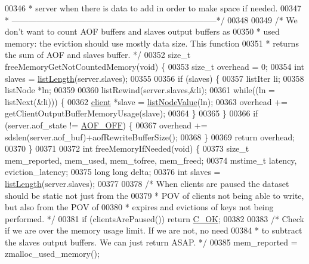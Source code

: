 \begin{DoxyCode}
00346 \textcolor{comment}{ * server when there is data to add in order to make space if needed.}
00347 \textcolor{comment}{ * --------------------------------------------------------------------------*/}
00348 
00349 \textcolor{comment}{/* We don't want to count AOF buffers and slaves output buffers as}
00350 \textcolor{comment}{ * used memory: the eviction should use mostly data size. This function}
00351 \textcolor{comment}{ * returns the sum of AOF and slaves buffer. */}
00352 size\_t freeMemoryGetNotCountedMemory(\textcolor{keywordtype}{void}) \{
00353     size\_t overhead = 0;
00354     \textcolor{keywordtype}{int} slaves = \hyperlink{adlist_8h_afde0ab079f934670e82119b43120e94b}{listLength}(server.slaves);
00355 
00356     \textcolor{keywordflow}{if} (slaves) \{
00357         listIter li;
00358         listNode *ln;
00359 
00360         listRewind(server.slaves,&li);
00361         \textcolor{keywordflow}{while}((ln = listNext(&li))) \{
00362             \hyperlink{structclient}{client} *slave = \hyperlink{adlist_8h_af84cae230e7180ebcda1e2736fce9f65}{listNodeValue}(ln);
00363             overhead += getClientOutputBufferMemoryUsage(slave);
00364         \}
00365     \}
00366     \textcolor{keywordflow}{if} (server.aof\_state != \hyperlink{server_8h_a5226306fbcebcb6d5d02e0fef3c213c2}{AOF\_OFF}) \{
00367         overhead += sdslen(server.aof\_buf)+aofRewriteBufferSize();
00368     \}
00369     \textcolor{keywordflow}{return} overhead;
00370 \}
00371 
00372 \textcolor{keywordtype}{int} freeMemoryIfNeeded(\textcolor{keywordtype}{void}) \{
00373     size\_t mem\_reported, mem\_used, mem\_tofree, mem\_freed;
00374     mstime\_t latency, eviction\_latency;
00375     \textcolor{keywordtype}{long} \textcolor{keywordtype}{long} delta;
00376     \textcolor{keywordtype}{int} slaves = \hyperlink{adlist_8h_afde0ab079f934670e82119b43120e94b}{listLength}(server.slaves);
00377 
00378     \textcolor{comment}{/* When clients are paused the dataset should be static not just from the}
00379 \textcolor{comment}{     * POV of clients not being able to write, but also from the POV of}
00380 \textcolor{comment}{     * expires and evictions of keys not being performed. */}
00381     \textcolor{keywordflow}{if} (clientsArePaused()) \textcolor{keywordflow}{return} \hyperlink{server_8h_a303769ef1065076e68731584e758d3e1}{C\_OK};
00382 
00383     \textcolor{comment}{/* Check if we are over the memory usage limit. If we are not, no need}
00384 \textcolor{comment}{     * to subtract the slaves output buffers. We can just return ASAP. */}
00385     mem\_reported = zmalloc\_used\_memory();

\end{DoxyCode}
